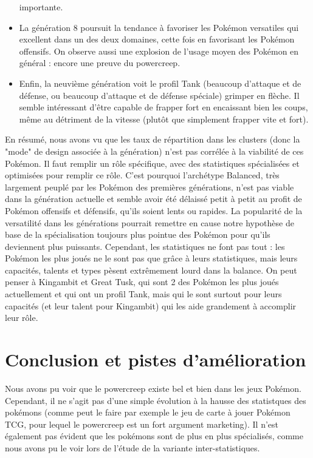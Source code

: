 \documentclass[a4paper,12pt]{article}
\begin{document}
\begin{itemize}
    importante.
    \item La génération 8 poursuit la tendance à favoriser les Pokémon
    versatiles qui excellent dans un des deux domaines, cette fois en favorisant
    les Pokémon offensifs. On observe aussi une explosion de l'usage moyen des
    Pokémon en général : encore une preuve du powercreep.
    \item Enfin, la neuvième génération voit le profil Tank (beaucoup d'attaque
    et de défense, ou beaucoup d'attaque et de défense spéciale) grimper en
    flèche. Il semble intéressant d'être capable de frapper fort en encaissant
    bien les coups, même au détriment de la vitesse (plutôt que simplement
    frapper vite et fort).
    
\end{itemize}

En résumé, nous avons vu que les taux de répartition dans les clusters (donc la
"mode" de design associée à la génération) n'est pas corrélée à la viabilité de
ces Pokémon. Il faut remplir un rôle spécifique, avec des statistiques
spécialisées et optimisées pour remplir ce rôle. C'est pourquoi l'archétype
Balanced, très largement peuplé par les Pokémon des premières générations, n'est
pas viable dans la génération actuelle et semble avoir été délaissé petit à
petit au profit de Pokémon offensifs et défensifs, qu'ils soient lents ou
rapides. La popularité de la versatilité dans les générations pourrait remettre
en cause notre hypothèse de base de la spécialisation toujours plus pointue des
Pokémon pour qu'ils deviennent plus puissants. Cependant, les statistiques ne
font pas tout : les Pokémon les plus joués ne le sont pas que grâce à leurs
statistiques, mais leurs capacités, talents et types pèsent extrêmement lourd
dans la balance. On peut penser à Kingambit et Great Tusk, qui sont 2 des
Pokémon les plus joués actuellement et qui ont un profil Tank, mais qui le sont
surtout pour leurs capacités (et leur talent pour Kingambit) qui les aide
grandement à accomplir leur rôle.

\section{Conclusion et pistes d'amélioration}

Nous avons pu voir que le powercreep existe bel et bien dans les jeux Pokémon.
Cependant, il ne s'agit pas d'une simple évolution à la hausse des statistques
des pokémons (comme peut le faire par exemple le jeu de carte à jouer Pokémon
TCG, pour lequel le powercreep est un fort argument marketing). Il n'est
également pas évident que les pokémons sont de plus en plus spécialisés, comme
nous avons pu le voir lors de l'étude de la variante inter-statistiques.
\end{document}
